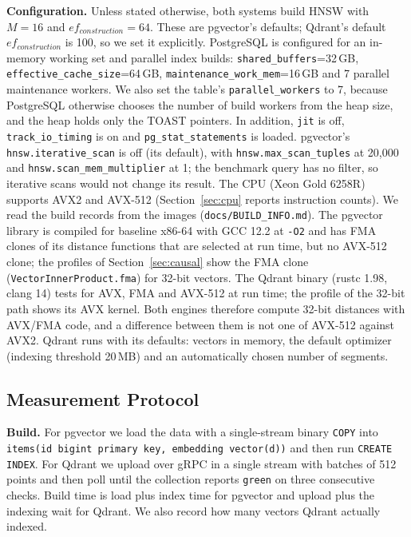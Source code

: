 \documentclass[preprint,12pt]{elsarticle}
\begin{document}
\textbf{Configuration.} Unless stated otherwise, both systems build HNSW with $M=16$ and
$ef_{construction}=64$. These are pgvector's defaults; Qdrant's default
$ef_{construction}$ is 100, so we set it explicitly. PostgreSQL is configured for an
in-memory working set and parallel index builds: \texttt{shared\_buffers}=32\,GB,
\texttt{effective\_cache\_size}=64\,GB, \texttt{maintenance\_work\_mem}=16\,GB and
7 parallel maintenance workers. We also set the table's \texttt{parallel\_workers} to 7,
because PostgreSQL otherwise chooses the number of build workers from the heap size, and
the heap holds only the TOAST pointers. In addition, \texttt{jit} is off,
\texttt{track\_io\_timing} is on and \texttt{pg\_stat\_statements} is loaded. pgvector's
\texttt{hnsw.iterative\_scan} is off (its default), with \texttt{hnsw.max\_scan\_tuples} at
20{,}000 and \texttt{hnsw.scan\_mem\_multiplier} at 1; the benchmark query has no filter, so
iterative scans would not change its result. The CPU (Xeon Gold 6258R) supports AVX2 and AVX-512 (Section~\ref{sec:cpu}
reports instruction counts). We read the build records from the images (\texttt{docs/BUILD\_INFO.md}). The pgvector
library is compiled for baseline x86-64 with GCC 12.2 at \texttt{-O2} and has FMA clones of its distance functions that are
selected at run time, but no AVX-512 clone; the profiles of Section~\ref{sec:causal} show the FMA clone (\texttt{VectorInnerProduct.fma})
for 32-bit vectors. The Qdrant binary (rustc 1.98, clang 14) tests for AVX, FMA and AVX-512 at run time; the profile of the 32-bit path shows
its AVX kernel. Both engines therefore compute 32-bit distances with AVX/FMA code, and a difference between them is not one of AVX-512 against AVX2.
Qdrant runs with its defaults: vectors in memory, the default optimizer (indexing threshold 20\,MB)
and an automatically chosen number of segments.

\subsection{Measurement Protocol}
\label{sec:protocol}

\textbf{Build.} For pgvector we load the data with a single-stream binary \texttt{COPY}
into \texttt{items(id bigint primary key, embedding vector(d))} and then run
\texttt{CREATE INDEX}. For Qdrant we upload over gRPC in a single stream with batches of
512 points and then poll until the collection reports \texttt{green} on three
consecutive checks. Build time is load plus index time for pgvector and upload plus the
indexing wait for Qdrant. We also record how many vectors Qdrant actually indexed.
\end{document}
